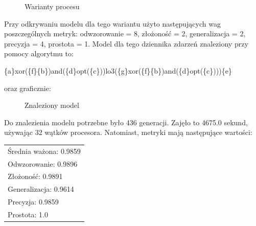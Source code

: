 \begin{figure}[H]
	\caption{\label{fig:flow_chart}Warianty procesu}
\end{figure}

Przy odkrywaniu modelu dla tego wariantu użyto następujących wag poszczególnych metryk: odwzorowanie = 8, złożoność = 2, generalizacja = 2, precyzja = 4, prostota = 1. Model dla tego dziennika zdarzeń znaleziony przy pomocy algorytmu to:
\begin{center}
	\{a\}xor(\{f\}\{b\})and(\{d\}opt(\{c\}))lo3(\{g\}xor(\{f\}\{b\})and(\{d\}opt(\{c\})))\{e\}
\end{center}
oraz graficznie:

\begin{figure}[H]
	\caption{\label{fig:flow_chart}Znaleziony model}
\end{figure}

Do znalezienia modelu potrzebne było 436 generacji. Zajęło to 4675.0 sekund, używając 32 wątków procesora. Natomiast, metryki mają następujące wartości: 

 \begin{center}
  \begin{tabular}{l}
	Średnia ważona: 0.9859 \\
	Odwzorowanie: 0.9896 \\
	Złożoność: 0.9891 \\
	Generalizacja: 0.9614 \\
	Precyzja: 0.9859 \\
	Prostota: 1.0
  \end{tabular}
 \end{center}
 
